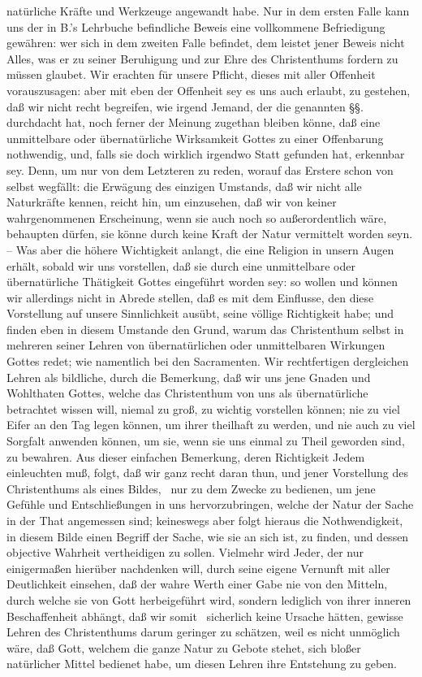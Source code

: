 natürliche Kräfte und Werkzeuge angewandt habe. Nur in dem ersten Falle kann uns der in B.'s Lehrbuche befindliche Beweis eine vollkommene Befriedigung gewähren: wer sich in dem zweiten Falle befindet, dem leistet jener Beweis nicht Alles, was er zu seiner Beruhigung und zur Ehre des Christenthums fordern zu müssen glaubet. Wir erachten für unsere Pflicht, dieses mit aller Offenheit vorauszusagen: aber mit eben der Offenheit sey es uns auch erlaubt, zu gestehen, daß wir nicht recht begreifen, wie irgend Jemand, der die genannten §§. durchdacht hat, noch ferner der Meinung zugethan bleiben könne, daß eine unmittelbare oder übernatürliche Wirksamkeit Gottes zu einer Offenbarung nothwendig, und, falls sie doch wirklich irgendwo Statt gefunden hat, erkennbar sey. Denn, um nur von dem Letzteren zu reden, worauf das Erstere schon von selbst wegfällt: die Erwägung des einzigen Umstands, daß wir nicht alle Naturkräfte kennen, reicht hin, um einzusehen, daß wir von keiner wahrgenommenen Erscheinung, wenn sie auch noch so außerordentlich wäre, behaupten dürfen, sie könne durch keine Kraft der Natur vermittelt worden seyn. -- Was aber die höhere Wichtigkeit anlangt, die eine Religion in unsern Augen erhält, sobald wir uns vorstellen, daß sie durch eine unmittelbare oder übernatürliche Thätigkeit Gottes eingeführt worden sey: so wollen und können wir allerdings nicht in Abrede stellen, daß es mit dem Einflusse, den diese Vorstellung auf unsere Sinnlichkeit ausübt, seine völlige Richtigkeit habe; und finden eben in diesem Umstande den Grund, warum das Christenthum selbst in mehreren seiner Lehren von übernatürlichen oder unmittelbaren Wirkungen Gottes redet; wie namentlich bei den Sacramenten. Wir rechtfertigen dergleichen Lehren als bildliche, durch die Bemerkung, daß wir uns jene Gnaden und Wohlthaten Gottes, welche das Christenthum von uns als übernatürliche betrachtet wissen will, niemal zu groß, zu wichtig vorstellen können; nie zu viel Eifer an den Tag legen können, um ihrer theilhaft zu werden, und nie auch zu viel Sorgfalt anwenden können, um sie, wenn sie uns einmal zu Theil geworden sind, zu bewahren. Aus dieser einfachen Bemerkung, deren Richtigkeit Jedem einleuchten muß, folgt, daß wir ganz recht daran thun, und jener Vorstellung des Christenthums als eines Bildes, \dh\  nur zu dem Zwecke zu bedienen, um jene Gefühle und Entschließungen in uns hervorzubringen, welche der Natur der Sache in der That angemessen sind; keineswegs aber folgt hieraus die Nothwendigkeit, in diesem Bilde einen Begriff der Sache, wie sie an sich ist, zu finden, und dessen objective Wahrheit vertheidigen zu sollen. Vielmehr wird Jeder, der nur einigermaßen hierüber nachdenken will, durch seine eigene Vernunft mit aller Deutlichkeit einsehen, daß der wahre Werth einer Gabe nie von den Mitteln, durch welche sie von Gott herbeigeführt wird, sondern lediglich von ihrer inneren Beschaffenheit abhängt, daß wir somit \zB\ sicherlich keine Ursache hätten, gewisse Lehren des Christenthums darum geringer zu schätzen, weil es nicht unmöglich wäre, daß Gott, welchem die ganze Natur zu Gebote stehet, sich bloßer natürlicher Mittel bedienet habe, um diesen Lehren ihre Entstehung zu geben.  \par 
